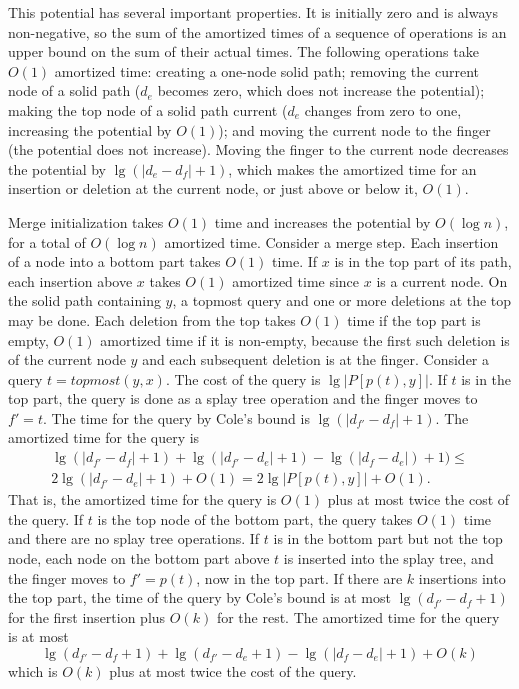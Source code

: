 \documentclass[twoside,leqno,twocolumn]{article}
\begin{document}
This potential has several important properties.  It is initially zero and is always non-negative, so the sum of the amortized times of a sequence of operations is an upper bound on the sum of their actual times. The following operations take $O(1)$ amortized time: creating a one-node solid path; removing the current node of a solid path ($d_e$ becomes zero, which does not increase the potential); making the top node of a solid path current ($d_e$ changes from zero to one, increasing the potential by $O(1)$);  and moving the current node to the finger (the potential does not increase).  Moving the finger to the current node decreases the potential by $\lg(|d_e - d_f| + 1)$, which makes the amortized time for an insertion or deletion at the current node, or just above or below it, $O(1)$.

Merge initialization takes $O(1)$ time and increases the potential by $O(\log n)$, for a total of $O(\log n)$ amortized time.  Consider a merge step.  Each insertion of a node into a bottom part takes $O(1)$ time.  If $x$ is in the top part of its path, each insertion above $x$ takes $O(1)$ amortized time since $x$ is a current node.  On the solid path containing $y$, a topmost query and one or more deletions at the top may be done.  Each deletion from the top takes $O(1)$ time if the top part is empty,  $O(1)$ amortized time if it is non-empty, because the first such deletion is of the current node $y$ and each subsequent deletion is at the finger.  Consider  a  query $t = \mathit{topmost}(y, x)$.  The cost of the query is $\lg|P[p(t), y]|$.  If $t$ is in the top part, the query is done as a splay tree operation and the finger moves to $f' = t$. The time for the query by Cole's bound is $\lg(|d_{f'} - d_f| + 1)$.  The amortized time for the query is
\begin{eqnarray*}
\lg(|d_{f'} - d_f| + 1) + \lg(|d_{f'} - d_e| + 1) - \lg(|d_f - d_e|) + 1)  \le  \\
2 \lg(|d_{f'} - d_e| + 1) + O(1) = 2 \lg|P[p(t), y]| + O(1).
\end{eqnarray*}
That is, the amortized time for the query is $O(1)$ plus at most twice the cost of the query.  If $t$ is the top node of the bottom part, the query takes $O(1)$ time and there are no splay tree operations.  If $t$ is in the bottom part but not the top node, each node on the bottom part above $t$ is inserted into the splay tree, and the finger moves to $f'=p(t)$, now in the top part.  If there are $k$ insertions into the top part, the time of the query by Cole's bound is at most $\lg(d_{f'} - d_f + 1)$ for the first insertion plus $O(k)$ for the rest.
The amortized time for the query is at most
$$
    \lg(d_{f'} - d_f + 1) + \lg(d_{f'} - d_e +1) - \lg(|d_f - d_e| + 1) + O(k)
$$
which is $O(k)$ plus at most twice the cost of the query.
\end{document}
